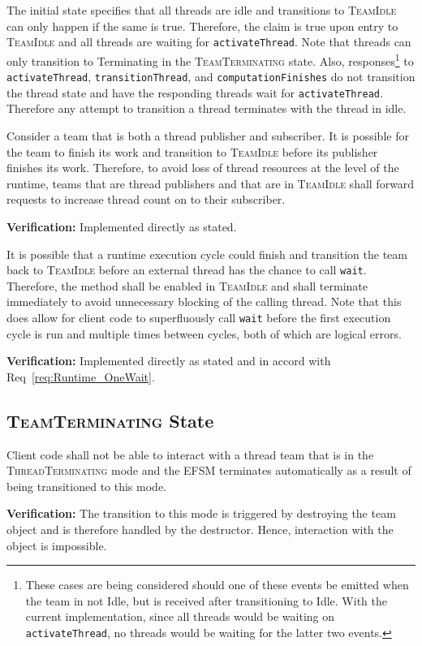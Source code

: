 \documentclass{article}
\newcommand{\TeamIdle}          {\textsc{TeamIdle}}
\newcommand{\TeamTerminating}   {\textsc{TeamTerminating}}
\newcommand{\ThreadTerminating} {\textsc{ThreadTerminating}}
\begin{document}
The initial state specifies that all threads are idle and transitions to
{\TeamIdle} can only happen if the same is true.  Therefore, the claim is true
upon entry to {\TeamIdle} and all threads are waiting for \texttt{activateThread}.
Note that threads can only transition to Terminating in the {\TeamTerminating} 
state.  Also, responses\footnote{These cases are being considered should one of
these events be emitted when the team in not Idle, but is received after
transitioning to Idle.  With the current implementation, since all threads would
be waiting on \texttt{activateThread}, no threads would be waiting for the
latter two events.} to \texttt{activateThread}, \texttt{transitionThread}, and
\texttt{computationFinishes} do not transition the thread state and have the
responding threads wait for \texttt{activateThread}.  Therefore any attempt to
transition a thread terminates with the thread in idle.\\

\begin{req}
Consider a team that is both a thread publisher and subscriber.  It is possible
for the team to finish its work and transition to {\TeamIdle} before its
publisher finishes its work.  Therefore, to avoid loss of thread resources at
the level of the runtime, teams that are thread publishers and that are in
{\TeamIdle} shall forward requests to increase thread count on to their
subscriber.
\end{req}
\textbf{Verification:}\hspace{0.125in}  Implemented directly as stated.

\begin{req}
It is possible that a runtime execution cycle could finish and transition the
team back to {\TeamIdle} before an external thread has the chance to call
\texttt{wait}.  Therefore, the method shall be enabled in {\TeamIdle} and shall
terminate immediately to avoid unnecessary blocking of the calling thread.  Note
that this does allow for client code to superfluously call \texttt{wait} before
the first execution cycle is run and multiple times between cycles, both of
which are logical errors.
\end{req}
\textbf{Verification:}\hspace{0.125in}  Implemented directly as stated and in
accord with Req~\ref{req:Runtime_OneWait}.  


\subsection{{\TeamTerminating} State}
\begin{req}
Client code shall not be able to interact with a thread team that is in the
{\ThreadTerminating} mode and the EFSM terminates automatically as a result of
being transitioned to this mode.
\end{req}
\textbf{Verification:}\hspace{0.125in} The transition to this mode is triggered
by destroying the team object and is therefore handled by the destructor.
Hence, interaction with the object is impossible.
\end{document}
